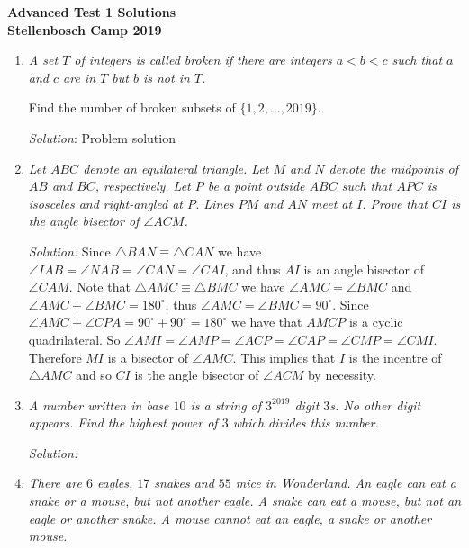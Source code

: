 \documentclass{article}
\begin{document}
\begin{center}
  \textbf{\Large Advanced Test 1 Solutions}
  \\ \vspace{1em}
  \textbf{\large Stellenbosch Camp 2019}
\end{center}


\begin{enumerate}[1.]

\item %
{\itshape
A set $T$ of integers is called \emph{broken} if there are integers $a < b < c$ such that $a$ and $c$ are in $T$ but $b$ is not in $T$.

Find the number of broken subsets of $\{1, 2, \dotsc, 2019\}$.}

\textit{Solution}: Problem solution


\item %
{\itshape
Let $ABC$ denote an equilateral triangle.
Let $M$ and $N$ denote the midpoints of $AB$ and $BC$, respectively.
Let $P$ be a point outside $ABC$ such that $APC$ is isosceles and right-angled at $P$.
Lines $PM$ and $AN$ meet at $I$.
Prove that $CI$ is the angle bisector of $\angle ACM$.}

\textit{Solution:}
Since $\triangle BAN \equiv \triangle CAN$ we have $\angle IAB = \angle NAB = \angle CAN = \angle CAI $, and thus $AI$ is an angle bisector of $\angle CAM$. Note that $\triangle AMC \equiv \triangle BMC$ we have $\angle AMC = \angle BMC$ and $\angle AMC + \angle BMC =180^\circ$, thus $\angle AMC = \angle BMC = 90^\circ$. Since $\angle AMC + \angle CPA = 90^\circ +90^\circ =180^\circ$ we have that $AMCP$ is a cyclic quadrilateral. So $\angle AMI = \angle AMP = \angle ACP = \angle CAP = \angle CMP = \angle CMI$. Therefore $MI$ is a bisector of $\angle AMC$. This implies that $I$ is the incentre of $\triangle AMC$ and so $CI$ is the angle bisector of $\angle ACM$ by necessity.


\item %
{\itshape
A number written in base $10$ is a string of $3^{2019}$ digit $3$s.
No other digit appears.
Find the highest power of $3$ which divides this number.}

\textit{Solution:}


\item %
{\itshape
There are $6$ eagles, $17$ snakes and $55$ mice in Wonderland.
An eagle can eat a snake or a mouse, but not another eagle.
A snake can eat a mouse, but not an eagle or another snake.
A mouse cannot eat an eagle, a snake or another mouse.

}
\end{enumerate}
\end{document}
